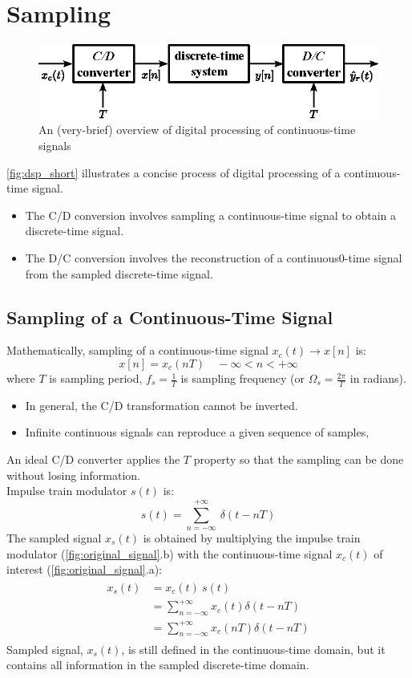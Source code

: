 \section{Sampling}
\begin{figure}[H]
    \centering
    \includegraphics[width=.65\textwidth]{images/digital-processing-of-continuous-signals-short.eps}
    \caption{An (very-brief) overview of  digital processing of continuous-time signals}
    \label{fig:dsp_short}
\end{figure}
\autoref{fig:dsp_short} illustrates a concise process of digital processing of a continuous-time signal. 
\begin{itemize}
    \item The C/D conversion involves sampling a continuous-time signal to obtain a discrete-time signal.

    \item The D/C conversion involves the reconstruction of a continuous0-time signal from the sampled discrete-time signal.
\end{itemize} 

\subsection{Sampling of a Continuous-Time Signal}
Mathematically, sampling of a continuous-time signal $x_{c}(t) \to x[n]$ is:
\[ x[n] = x_{c}(nT) \quad -\infty < n < +\infty \]
where $T$ is sampling period, $f_{s} = \frac{1}{T}$ is sampling frequency (or $\Omega_{s}=\frac{2\pi}{T}$ in radians). 
\begin{itemize}
    \item In general, the C/D transformation cannot be inverted.
    \item Infinite continuous signals can reproduce a given sequence of samples,
\end{itemize}
An ideal C/D converter applies the $T$ property so that the sampling can be done without losing information. \\


Impulse train modulator $s(t)$ is: 
\[ 
    s(t) = \sum_{n=-\infty}^{+\infty} \ \delta(t-nT) 
\]
The sampled signal $x_{s}(t)$ is obtained by multiplying the impulse train modulator (\autoref{fig:original_signal}.b) with the continuous-time signal $x_{c}(t)$ of interest (\autoref{fig:original_signal}.a):
\begin{align*} 
\begin{split}
x_{s}(t) &= x_{c}(t) \ s(t)\\
&= \sum_{n=-\infty}^{+\infty} x_{c}(t) \delta(t-nT)\\
&= \sum_{n=-\infty}^{+\infty} x_{c}(nT) \delta(t-nT)
\end{split}
\end{align*}
Sampled signal, $x_{s}(t)$, is still defined in the continuous-time domain, but it contains all information in the sampled discrete-time domain.\\\\

